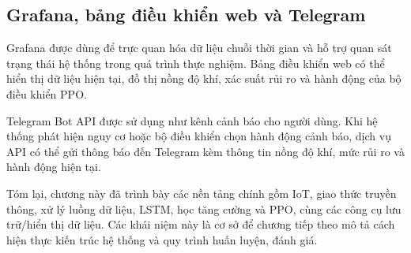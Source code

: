 
\subsection{Grafana, bảng điều khiển web và Telegram}

Grafana được dùng để trực quan hóa dữ liệu chuỗi thời gian và hỗ trợ quan sát trạng thái hệ thống trong quá trình thực nghiệm. Bảng điều khiển web có thể hiển thị dữ liệu hiện tại, đồ thị nồng độ khí, xác suất rủi ro và hành động của bộ điều khiển PPO.


Telegram Bot API được sử dụng như kênh cảnh báo cho người dùng. Khi hệ thống phát hiện nguy cơ hoặc bộ điều khiển chọn hành động cảnh báo, dịch vụ API có thể gửi thông báo đến Telegram kèm thông tin nồng độ khí, mức rủi ro và hành động hiện tại.


\vspace{0.5em}

Tóm lại, chương này đã trình bày các nền tảng chính gồm IoT, giao thức truyền thông, xử lý luồng dữ liệu, LSTM, học tăng cường và PPO, cùng các công cụ lưu trữ/hiển thị dữ liệu. Các khái niệm này là cơ sở để chương tiếp theo mô tả cách hiện thực kiến trúc hệ thống và quy trình huấn luyện, đánh giá.
